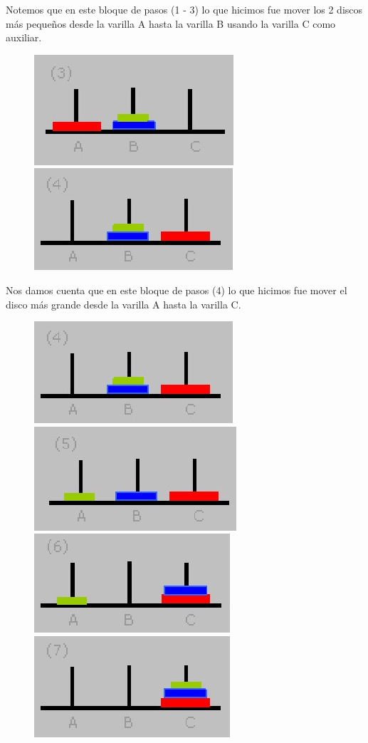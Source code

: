 Notemos que en este bloque de pasos (1 - 3) lo que hicimos fue mover los 2 discos más pequeños desde la varilla A hasta la varilla B usando la varilla C como auxiliar.

\begin{figure}[H]
	\centering
	\includegraphics[width=0.42\linewidth]{cp1/hanoi3/step-3.jpg}
	\includegraphics[width=0.45\linewidth]{cp1/hanoi3/step-4.jpg}
\end{figure}

Nos damos cuenta que en este bloque de pasos (4) lo que hicimos fue mover el disco más grande desde la varilla A hasta la varilla C.

\begin{figure}[H]
	\centering
	\includegraphics[width=0.45\linewidth]{cp1/hanoi3/step-4.jpg}
	\includegraphics[width=0.45\linewidth]{cp1/hanoi3/step-5.jpg}
	\includegraphics[width=0.45\linewidth]{cp1/hanoi3/step-6.jpg}
	\includegraphics[width=0.44\linewidth]{cp1/hanoi3/step-7.jpg}
\end{figure}

